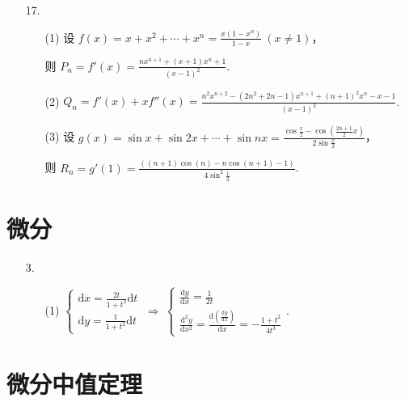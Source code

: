 \documentclass[oneside]{ctexbook} %
\begin{document}
\begin{enumerate}
    \item[17.]
    \begin{enumerate}
        \item[(1)]
        设 $\displaystyle f(x) = x + x^2 + \cdots + x^n = \frac{x(1-x^n)}{1-x} \ (x \neq 1)$，
        
        则 $\displaystyle P_n = f'(x) = \frac{nx^{n+1}+(x+1)x^n+1}{(x-1)^2}$.
        \item[(2)]
        $\displaystyle Q_n = f'(x)+xf''(x) = \frac{n^2x^{n+2}-(2n^2+2n-1)x^{n+1}+(n+1)^2x^n-x-1}{(x-1)^3}$.
        \item[(3)]
        设 $\displaystyle g(x) = \sin x + \sin 2x + \cdots + \sin nx = \frac{\cos\frac x 2 - \cos(\frac {2n+1} 2 x)}{2\sin\frac x 2}$，
        
        则 $\displaystyle R_n = g'(1) = \frac{((n+1)\cos(n)-n\cos(n+1)-1)}{4\sin^2\frac 1 2}$.
    \end{enumerate}
\end{enumerate}

\section{微分}

\begin{enumerate}
    \item[3.]
    \begin{enumerate}
        \item[(1)]
        $\displaystyle \begin{cases} \mathrm dx = \frac{2t}{1+t^2} \mathrm dt \\ \mathrm dy = \frac 1 {1+t^2} \mathrm dt \end{cases} \ \Rightarrow \ \begin{cases} \frac{\mathrm dy}{\mathrm dx} = \frac 1 {2t} \\ \frac{\mathrm d^2y}{\mathrm dx^2} = \frac{\mathrm d \left( \frac{\mathrm dy}{\mathrm dx} \right)}{\mathrm dx} = -\frac{1+t^2}{4t^3} \end{cases}$.
    \end{enumerate}
\end{enumerate}

\section{微分中值定理}
\end{document}
